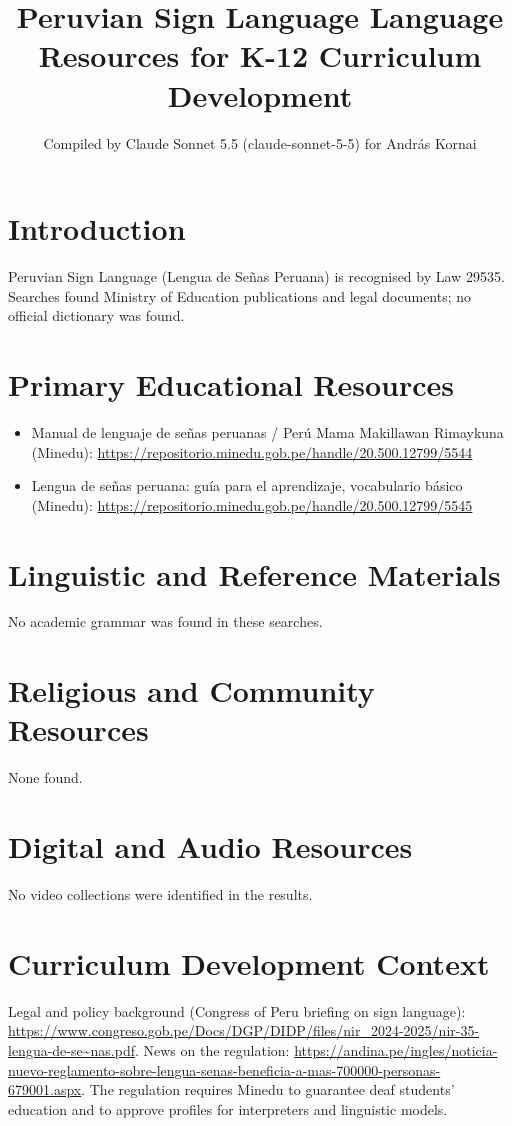 \documentclass[12pt]{article}
\title{Peruvian Sign Language Language Resources for K-12 Curriculum Development}
\author{Compiled by Claude Sonnet 5.5 (claude-sonnet-5-5) for Andr\'as Kornai}
\date{}
\begin{document}
\maketitle
\section{Introduction}
Peruvian Sign Language (Lengua de Se\~nas Peruana) is recognised by Law 29535. Searches found Ministry of Education publications and legal documents; no official dictionary was found.
\section{Primary Educational Resources}
\begin{itemize}
\item Manual de lenguaje de se\~nas peruanas / Per\'u Mama Makillawan Rimaykuna (Minedu): \url{https://repositorio.minedu.gob.pe/handle/20.500.12799/5544}
\item Lengua de se\~nas peruana: gu\'ia para el aprendizaje, vocabulario b\'asico (Minedu): \url{https://repositorio.minedu.gob.pe/handle/20.500.12799/5545}
\end{itemize}
\section{Linguistic and Reference Materials}
No academic grammar was found in these searches.
\section{Religious and Community Resources}
None found.
\section{Digital and Audio Resources}
No video collections were identified in the results.
\section{Curriculum Development Context}
Legal and policy background (Congress of Peru briefing on sign language): \url{https://www.congreso.gob.pe/Docs/DGP/DIDP/files/nir_2024-2025/nir-35-lengua-de-se\~nas.pdf}. News on the regulation: \url{https://andina.pe/ingles/noticia-nuevo-reglamento-sobre-lengua-senas-beneficia-a-mas-700000-personas-679001.aspx}. The regulation requires Minedu to guarantee deaf students' education and to approve profiles for interpreters and linguistic models.
\end{document}
